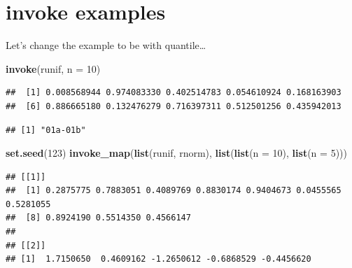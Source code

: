 \documentclass[]{book}
\newenvironment{Shaded}{\begin{snugshade}}{\end{snugshade}}
\newcommand{\DataTypeTok}[1]{\textcolor[rgb]{0.13,0.29,0.53}{#1}}
\newcommand{\DecValTok}[1]{\textcolor[rgb]{0.00,0.00,0.81}{#1}}
\newcommand{\KeywordTok}[1]{\textcolor[rgb]{0.13,0.29,0.53}{\textbf{#1}}}
\newcommand{\NormalTok}[1]{#1}
\newcommand{\OperatorTok}[1]{\textcolor[rgb]{0.81,0.36,0.00}{\textbf{#1}}}
\newcommand{\StringTok}[1]{\textcolor[rgb]{0.31,0.60,0.02}{#1}}
\theoremstyle{definition}
\theoremstyle{definition}
\theoremstyle{definition}
\theoremstyle{remark}
\begin{document}
\hypertarget{invoke-examples}{%
\section{invoke examples}\label{invoke-examples}}

Let's change the example to be with quantile\ldots{}

\begin{Shaded}
\begin{Highlighting}[]
\KeywordTok{invoke}\NormalTok{(runif, }\DataTypeTok{n =} \DecValTok{10}\NormalTok{)}
\end{Highlighting}
\end{Shaded}

\begin{verbatim}
##  [1] 0.008568944 0.974083330 0.402514783 0.054610924 0.168163903
##  [6] 0.886665180 0.132476279 0.716397311 0.512501256 0.435942013
\end{verbatim}

\begin{Shaded}
\end{Shaded}

\begin{verbatim}
## [1] "01a-01b"
\end{verbatim}

\begin{Shaded}
\begin{Highlighting}[]
\KeywordTok{set.seed}\NormalTok{(}\DecValTok{123}\NormalTok{)}
\KeywordTok{invoke_map}\NormalTok{(}\KeywordTok{list}\NormalTok{(runif, rnorm), }\KeywordTok{list}\NormalTok{(}\KeywordTok{list}\NormalTok{(}\DataTypeTok{n =} \DecValTok{10}\NormalTok{), }\KeywordTok{list}\NormalTok{(}\DataTypeTok{n =} \DecValTok{5}\NormalTok{)))}
\end{Highlighting}
\end{Shaded}

\begin{verbatim}
## [[1]]
##  [1] 0.2875775 0.7883051 0.4089769 0.8830174 0.9404673 0.0455565 0.5281055
##  [8] 0.8924190 0.5514350 0.4566147
## 
## [[2]]
## [1]  1.7150650  0.4609162 -1.2650612 -0.6868529 -0.4456620
\end{verbatim}
\end{document}

